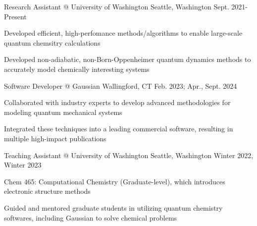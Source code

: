 


\begin{cventries}


\cventryexp
{Research Assistant @ University of Washington} %
{Seattle, Washington} %
{Sept. 2021- Present} %
{ %
\begin{cvitems}
\item {Developed efficient, high-perfomance methods/algorithms to enable large-scale quantum chemsitry calculations}
\item {Developed non-adiabatic, non-Born-Oppenheimer quantum dynamics methods to accurately model chemically interesting systems}
\end{cvitems}
}


\cventryexp
{Software Developer @ Gaussian} %
{Wallingford, CT} %
{Feb. 2023; Apr., Sept. 2024} %
{ %
\begin{cvitems}
\item{Collaborated with industry experts to develop advanced methodologies for modeling quantum mechanical systems}
\item{Integrated these techniques into a leading commercial software, resulting in multiple high-impact publications}
\end{cvitems}
}


\cventryexp
{Teaching Assistant @ University of Washington} %
{Seattle, Washington} %
{Winter 2022, Winter 2023 } %
{ %
\begin{cvitems}
\item {Chem 465: Computational Chemistry (Graduate-level), which introduces electronic structure methods }
\item {Guided and mentored graduate students in utilizing quantum chemistry softwares, including Gaussian to solve chemical problems}
\end{cvitems}
}

\end{cventries}